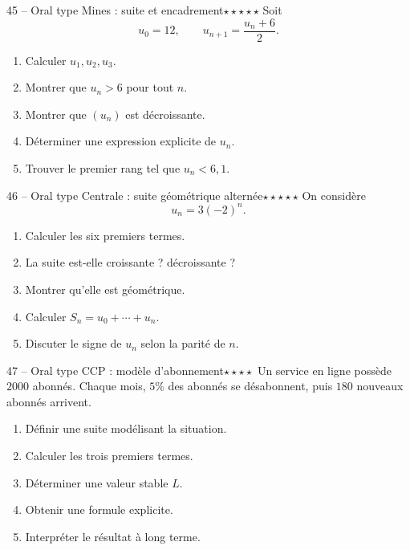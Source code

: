 \documentclass[11pt,a4paper]{article}
\newcommand{\quatreetoiles}{\(\star\star\star\star\)}
\newcommand{\cinqetoiles}{\(\star\star\star\star\star\)}
\begin{document}
\begin{exobox}{45 -- Oral type Mines : suite et encadrement}{\cinqetoiles}
Soit
\[
u_0=12,\qquad u_{n+1}=\frac{u_n+6}{2}.
\]
\begin{enumerate}[label=\alph*)]
  \item Calculer \(u_1,u_2,u_3\).
  \item Montrer que \(u_n>6\) pour tout \(n\).
  \item Montrer que \((u_n)\) est décroissante.
  \item Déterminer une expression explicite de \(u_n\).
  \item Trouver le premier rang tel que \(u_n<6{,}1\).
\end{enumerate}
\end{exobox}

\begin{exobox}{46 -- Oral type Centrale : suite géométrique alternée}{\cinqetoiles}
On considère
\[
u_n=3(-2)^n.
\]
\begin{enumerate}[label=\alph*)]
  \item Calculer les six premiers termes.
  \item La suite est-elle croissante ? décroissante ?
  \item Montrer qu'elle est géométrique.
  \item Calculer \(S_n=u_0+\cdots+u_n\).
  \item Discuter le signe de \(u_n\) selon la parité de \(n\).
\end{enumerate}
\end{exobox}

\begin{exobox}{47 -- Oral type CCP : modèle d'abonnement}{\quatreetoiles}
Un service en ligne possède \(2000\) abonnés. Chaque mois, \(5\%\) des abonnés se désabonnent, puis \(180\) nouveaux abonnés arrivent.
\begin{enumerate}[label=\alph*)]
  \item Définir une suite modélisant la situation.
  \item Calculer les trois premiers termes.
  \item Déterminer une valeur stable \(L\).
  \item Obtenir une formule explicite.
  \item Interpréter le résultat à long terme.
\end{enumerate}
\end{exobox}
\end{document}
